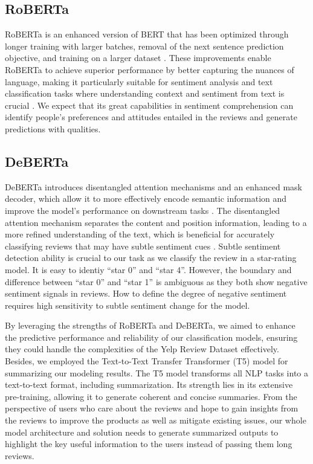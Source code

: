 \documentclass[11pt]{article}
\begin{document}
\subsection{RoBERTa}
RoBERTa is an enhanced version of BERT that has been optimized through longer training with larger batches, removal of the next sentence prediction objective, and training on a larger dataset \citep{liu2012sentiment}. These improvements enable RoBERTa to achieve superior performance by better capturing the nuances of language, making it particularly suitable for sentiment analysis and text classification tasks where understanding context and sentiment from text is crucial \citep{liu2012sentiment}. We expect that its great capabilities in sentiment comprehension can identify people’s preferences and attitudes entailed in the reviews and generate predictions with qualities.

\subsection{DeBERTa}
DeBERTa introduces disentangled attention mechanisms and an enhanced mask decoder, which allow it to more effectively encode semantic information and improve the model's performance on downstream tasks \citep{he2020deberta}. The disentangled attention mechanism separates the content and position information, leading to a more refined understanding of the text, which is beneficial for accurately classifying reviews that may have subtle sentiment cues \citep{he2020deberta}. Subtle sentiment detection ability is crucial to our task as we classify the review in a star-rating model. It is easy to identiy “star 0” and “star 4”. However, the boundary and difference between “star 0” and “star 1” is ambiguous as they both show negative sentiment signals in reviews. How to define the degree of negative sentiment requires high sensitivity to subtle sentiment change for the model.

By leveraging the strengths of RoBERTa and DeBERTa, we aimed to enhance the predictive performance and reliability of our classification models, ensuring they could handle the complexities of the Yelp Review Dataset effectively. Besides, we employed the Text-to-Text Transfer Transformer (T5) model for summarizing our modeling results. The T5 model transforms all NLP tasks into a text-to-text format, including summarization. Its strength lies in its extensive pre-training, allowing it to generate coherent and concise summaries. From the perspective of users who care about the reviews and hope to gain insights from the reviews to improve the products as well as mitigate existing issues, our whole model architecture and solution needs to generate summarized outputs to highlight the key useful information to the users instead of passing them long reviews.
\end{document}
